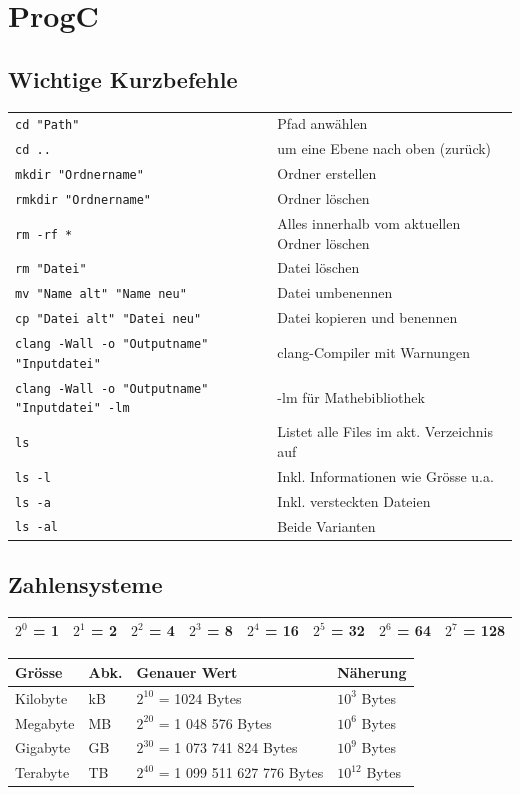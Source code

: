 \section{ProgC}

    \subsection{Wichtige Kurzbefehle}
		\begin{tabular}{ll}
			\verb|cd "Path"| & Pfad anwählen \\
			\verb|cd ..| & um eine Ebene nach oben (zurück) \\
			\verb|mkdir "Ordnername"| & Ordner erstellen \\
			\verb|rmkdir "Ordnername"| & Ordner löschen \\
			\verb|rm -rf *| & Alles innerhalb vom aktuellen Ordner löschen \\
			\verb|rm "Datei"| & Datei löschen \\
			\verb|mv "Name alt" "Name neu"| & Datei umbenennen \\
			\verb|cp "Datei alt" "Datei neu"| & Datei kopieren und benennen \\
			\verb|clang -Wall -o "Outputname" "Inputdatei"| & clang-Compiler mit Warnungen \\
			\verb|clang -Wall -o "Outputname" "Inputdatei" -lm| & -lm für Mathebibliothek \\
			\verb|ls| & Listet alle Files im akt. Verzeichnis auf \\
			\verb|ls -l| & Inkl. Informationen wie Grösse u.a. \\
			\verb|ls -a| & Inkl. versteckten Dateien \\
			\verb|ls -al| & Beide Varianten \\
		\end{tabular}

	\subsection{Zahlensysteme}
		\begin{tabular}{|l|l|l|l|l|l|l|l|}
			\hline
			$2^0$ = 1 & $2^1$ = 2 & $2^2$ = 4 & $2^3$ = 8 & $2^4$ = 16 & $2^5$ = 32 & $2^6$ = 64 & $2^7$ = 128 \\
			\hline
		\end{tabular}

		\begin{tabular}{|l|l|l|l|}
			\hline
			\textbf{Grösse} & \textbf{Abk.} & \textbf{Genauer Wert} & \textbf{Näherung} \\
			\hline
			Kilobyte & kB & $2^{10}$ = 1024 Bytes & $10^3$ Bytes \\
			\hline
			Megabyte & MB & $2^{20}$ = 1 048 576 Bytes & $10^6$ Bytes \\
			\hline
			Gigabyte & GB & $2^{30}$ = 1 073 741 824 Bytes & $10^9$ Bytes \\
			\hline
			Terabyte & TB & $2^{40}$ = 1 099 511 627 776 Bytes & $10^12$ Bytes \\ 
			\hline
		\end{tabular}

